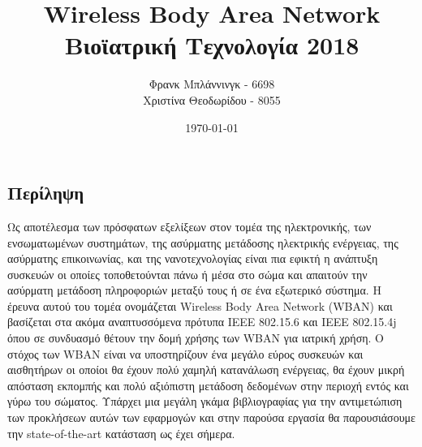\documentclass[11pt]{article}
\title{Wireless Body Area Network\\ Βιοϊατρική Τεχνολογία 2018}
\author{Φρανκ Μπλάννινγκ - 6698\\ Χριστίνα Θεοδωρίδου - 8055}
\date{\today}
\begin{document}
\maketitle

\subsection*{Περίληψη}
Ως αποτέλεσμα των πρόσφατων εξελίξεων στον τομέα της ηλεκτρονικής, των
ενσωματωμένων συστημάτων, της ασύρματης μετάδοσης ηλεκτρικής
ενέργειας, της ασύρματης επικοινωνίας, και της νανοτεχνολογίας είναι
πια εφικτή η ανάπτυξη συσκευών οι οποίες τοποθετούνται πάνω ή μέσα στο
σώμα και απαιτούν την ασύρματη μετάδοση πληροφοριών μεταξύ τους ή σε
ένα εξωτερικό σύστημα. Η έρευνα αυτού του τομέα ονομάζεται Wireless
Body Area Network (WBAN) και βασίζεται στα ακόμα αναπτυσσόμενα πρότυπα
IEEE 802.15.6 και IEEE 802.15.4j όπου σε συνδυασμό θέτουν την δομή
χρήσης των WBAN για ιατρική χρήση. Ο στόχος των WBAN είναι να
υποστηρίζουν ένα μεγάλο εύρος συσκευών και αισθητήρων οι οποίοι θα
έχουν πολύ χαμηλή κατανάλωση ενέργειας, θα έχουν μικρή απόσταση
εκπομπής και πολύ αξιόπιστη μετάδοση δεδομένων στην περιοχή εντός και
γύρω του σώματος. Υπάρχει μια μεγάλη γκάμα βιβλιογραφίας για την
αντιμετώπιση των προκλήσεων αυτών των εφαρμογών και στην παρούσα
εργασία θα παρουσιάσουμε την state-of-the-art κατάσταση ως έχει
σήμερα.





\end{document}
